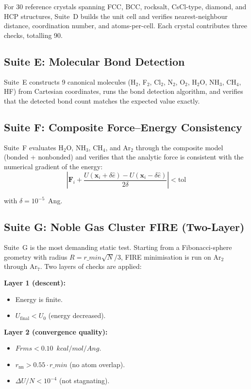 \documentclass[11pt,twoside]{article}
\def\AA{Ang}%
\def\kcalmol{kcal/mol}%
\def\Angstrom{Ang}%
\def\Frms{Frms}%
\def\rmin{r\_min}%
\newcommand{\Angstrom}{\text{\AA}}
\newcommand{\kcalmol}{\text{kcal/mol}}
\newcommand{\Frms}{F_{\mathrm{rms}}}
\newcommand{\rmin}{r_{\mathrm{min}}}
\begin{document}
For 30 reference crystals spanning FCC, BCC, rocksalt, CsCl-type, diamond, and HCP structures, Suite~D builds the unit cell and verifies nearest-neighbour distance, coordination number, and atoms-per-cell. Each crystal contributes three checks, totalling 90.

\subsection{Suite E: Molecular Bond Detection}

Suite~E constructs 9 canonical molecules (H$_2$, F$_2$, Cl$_2$, N$_2$, O$_2$, H$_2$O, NH$_3$, CH$_4$, HF) from Cartesian coordinates, runs the bond detection algorithm, and verifies that the detected bond count matches the expected value exactly.

\subsection{Suite F: Composite Force--Energy Consistency}

Suite~F evaluates H$_2$O, NH$_3$, CH$_4$, and Ar$_2$ through the composite model (bonded + nonbonded) and verifies that the analytic force is consistent with the numerical gradient of the energy:
\begin{equation}
  \left|\mathbf{F}_i + \frac{U(\mathbf{x}_i + \delta\hat{e}) - U(\mathbf{x}_i - \delta\hat{e})}{2\delta}\right| < \mathrm{tol}
  \label{eq:force-energy}
\end{equation}

with $\delta = 10^{-5}$~\AA.

\subsection{Suite G: Noble Gas Cluster FIRE (Two-Layer)}

Suite~G is the most demanding static test. Starting from a Fibonacci-sphere geometry with radius $R = \rmin\sqrt{N}/3$, FIRE minimisation is run on Ar$_2$ through Ar$_7$. Two layers of checks are applied:

\textbf{Layer 1 (descent):}
\begin{itemize}
  \item Energy is finite.
  \item $U_{\mathrm{final}} < U_0$ (energy decreased).
\end{itemize}

\textbf{Layer 2 (convergence quality):}
\begin{itemize}
  \item $\Frms < 0.10$~$\kcalmol/\Angstrom$.
  \item $r_{\mathrm{nn}} > 0.55 \cdot \rmin$ (no atom overlap).
  \item $\Delta U / N < 10^{-4}$ (not stagnating).
\end{itemize}
\end{document}
